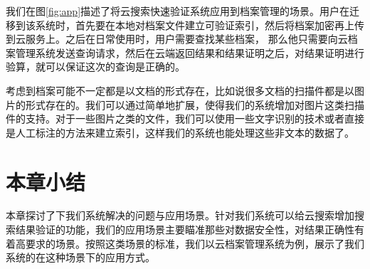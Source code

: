 我们在图\ref{fig:app}描述了将云搜索快速验证系统应用到档案管理的场景。用户在迁移到该系统时，首先要在本地对档案文件建立可验证索引，然后将档案加密再上传到云服务上。之后在日常使用时，用户需要查找某些档案，
那么他只需要向云档案管理系统发送查询请求，然后在云端返回结果和结果证明之后，对结果证明进行验算，就可以保证这次的查询是正确的。

考虑到档案可能不一定都是以文档的形式存在，比如说很多文档的扫描件都是以图片的形式存在的。我们可以通过简单地扩展，使得我们的系统增加对图片这类扫描件的支持。对于一些图片之类的文件，我们可以使用一些文字识别的技术或者直接是人工标注的方法来建立索引，这样我们的系统也能处理这些非文本的数据了。

\section{本章小结}
本章探讨了下我们系统解决的问题与应用场景。针对我们系统可以给云搜索增加搜索结果验证的功能，我们的应用场景主要瞄准那些对数据安全性，对结果正确性有着高要求的场景。按照这类场景的标准，我们以云档案管理系统为例，展示了我们系统的在这种场景下的应用方式。
